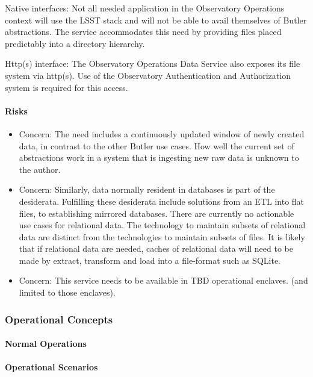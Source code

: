 Native interfaces: Not all needed application in the Observatory Operations context 
will use the LSST stack and will not be able to avail themselves of Butler abstractions.  
The service accommodates this need by providing files placed predictably into a 
directory hierarchy.

Http(s) interface: The Observatory Operations Data Service also exposes its 
file system via http(s). Use of the Observatory Authentication and Authorization 
system is required for this access.

\paragraph{Risks}

\begin{itemize}

\item Concern: The need includes a continuously updated window of newly created 
data, in contrast to the other Butler use cases.  How well the current set of 
abstractions work in a system that is ingesting new raw data  is unknown to the 
author.  

\item Concern: Similarly, data normally resident in databases is part of the desiderata. 
Fulfilling these desiderata include solutions from an ETL into flat files, to 
establishing mirrored databases. There are currently no actionable use cases 
for relational data. The technology to maintain subsets of relational data are distinct 
from the technologies to maintain subsets of files. It is likely that if relational data are 
needed, caches of relational data will need to be made by extract, transform and load 
into a file-format such as SQLite. 

\item Concern: This service needs to be available in TBD operational enclaves. (and limited to those enclaves).

\end{itemize}

\subsubsection{Operational Concepts}

\paragraph{Normal Operations}

\paragraph{Operational Scenarios}
